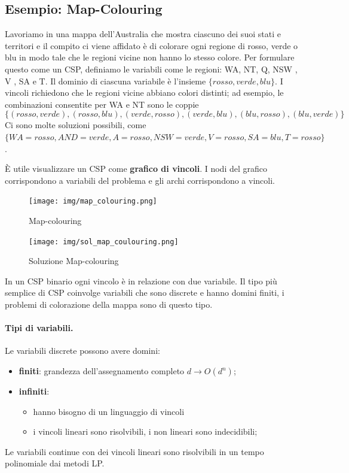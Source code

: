 \subsection{Esempio: Map-Colouring} 
Lavoriamo in una mappa dell'Australia che mostra ciascuno dei suoi stati e territori e il compito ci viene affidato è di colorare ogni regione di rosso, verde o blu in modo tale che le regioni vicine non hanno lo stesso colore. Per formulare questo come un CSP, definiamo le variabili come le regioni: WA, NT, Q, NSW , V , SA e T. Il dominio di ciascuna variabile è l'insieme $\{rosso, verde, blu\}$. I vincoli richiedono che le regioni vicine abbiano colori distinti; ad esempio, le combinazioni consentite per WA e NT sono le coppie 
\[\{(rosso, verde),(rosso, blu),(verde, rosso),(verde, blu),(blu, rosso),(blu, verde)\}\]
Ci sono molte soluzioni possibili, come  $\{WA = rosso, AND = verde, A = rosso, NSW = verde, V = rosso, SA = blu, T = rosso\}$.

È utile visualizzare un CSP come \textbf{grafico di vincoli}. I nodi
del grafico corrispondono a variabili del problema e gli archi corrispondono a vincoli.
\begin{figure}[H]
	\centering
    \texttt{[image: img/map\_colouring.png]}
	\caption{Map-colouring}\label{fig:map_colouring}
\end{figure}
\begin{figure}[H]
	\centering
    \texttt{[image: img/sol\_map\_coulouring.png]}
	\caption{Soluzione Map-colouring}\label{fig:sol_map_colouring}
\end{figure}
In un CSP binario ogni vincolo è in relazione con due variabile. Il tipo più semplice di CSP coinvolge variabili che sono discrete e hanno domini finiti, i problemi di colorazione della mappa sono di questo tipo.
\paragraph{Tipi di variabili.} Le variabili discrete possono avere domini:
\begin{itemize}
    \item \textbf{finiti}: grandezza dell'assegnamento completo $d \longrightarrow O(d^n)$;
    \item \textbf{infiniti}: \begin{itemize}
        \item hanno bisogno di un linguaggio di vincoli
        \item i vincoli lineari sono risolvibili, i non lineari sono indecidibili;
    \end{itemize}
\end{itemize}
Le variabili continue con dei vincoli lineari sono risolvibili in un tempo polinomiale dai metodi LP. 

